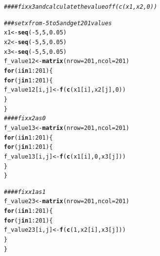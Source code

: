 \documentclass{article}\usepackage[]{graphicx}\usepackage[]{color}
\makeatletter
\newcommand{\hlnum}[1]{\textcolor[rgb]{0.686,0.059,0.569}{#1}}%
\newcommand{\hlcom}[1]{\textcolor[rgb]{0.678,0.584,0.686}{\textit{#1}}}%
\newcommand{\hlopt}[1]{\textcolor[rgb]{0,0,0}{#1}}%
\newcommand{\hlstd}[1]{\textcolor[rgb]{0.345,0.345,0.345}{#1}}%
\newcommand{\hlkwa}[1]{\textcolor[rgb]{0.161,0.373,0.58}{\textbf{#1}}}%
\newcommand{\hlkwb}[1]{\textcolor[rgb]{0.69,0.353,0.396}{#1}}%
\newcommand{\hlkwc}[1]{\textcolor[rgb]{0.333,0.667,0.333}{#1}}%
\newcommand{\hlkwd}[1]{\textcolor[rgb]{0.737,0.353,0.396}{\textbf{#1}}}%
\newenvironment{kframe}{%
 \def\at@end@of@kframe{}%
 \ifinner\ifhmode%
  \def\at@end@of@kframe{\end{minipage}}%
  \begin{minipage}{\columnwidth}%
 \fi\fi%
 \def\FrameCommand##1{\hskip\@totalleftmargin \hskip-\fboxsep
 \colorbox{shadecolor}{##1}\hskip-\fboxsep
     \hskip-\linewidth \hskip-\@totalleftmargin \hskip\columnwidth}%
 \MakeFramed {\advance\hsize-\width
   \@totalleftmargin\z@ \linewidth\hsize
   \@setminipage}}%
 {\par\unskip\endMakeFramed%
 \at@end@of@kframe}
\newenvironment{knitrout}{}{} %
\makeatother
\begin{document}
\begin{knitrout}
\color{fgcolor}\begin{kframe}
\begin{alltt}
\hlcom{####fix x3 and calculate the value of f(c(x1,x2,0))}

\hlcom{###set x from -5 to 5 and get 201 values}
\hlstd{x1}\hlkwb{<-}\hlkwd{seq}\hlstd{(}\hlopt{-}\hlnum{5}\hlstd{,}\hlnum{5}\hlstd{,}\hlnum{0.05}\hlstd{)}
\hlstd{x2}\hlkwb{<-}\hlkwd{seq}\hlstd{(}\hlopt{-}\hlnum{5}\hlstd{,}\hlnum{5}\hlstd{,}\hlnum{0.05}\hlstd{)}
\hlstd{x3}\hlkwb{<-}\hlkwd{seq}\hlstd{(}\hlopt{-}\hlnum{5}\hlstd{,}\hlnum{5}\hlstd{,}\hlnum{0.05}\hlstd{)}
\hlstd{f_value12}\hlkwb{<-}\hlkwd{matrix}\hlstd{(}\hlkwc{nrow}\hlstd{=}\hlnum{201}\hlstd{,}\hlkwc{ncol}\hlstd{=}\hlnum{201}\hlstd{)}
\hlkwa{for}\hlstd{(i} \hlkwa{in} \hlnum{1}\hlopt{:}\hlnum{201}\hlstd{)\{}
  \hlkwa{for}\hlstd{(j} \hlkwa{in} \hlnum{1}\hlopt{:}\hlnum{201}\hlstd{)\{}
    \hlstd{f_value12[i,j]}\hlkwb{<-}\hlkwd{f}\hlstd{(}\hlkwd{c}\hlstd{(x1[i],x2[j],}\hlnum{0}\hlstd{))}
  \hlstd{\}}
\hlstd{\}}
\hlcom{####fix x2 as 0}
\hlstd{f_value13}\hlkwb{<-}\hlkwd{matrix}\hlstd{(}\hlkwc{nrow}\hlstd{=}\hlnum{201}\hlstd{,}\hlkwc{ncol}\hlstd{=}\hlnum{201}\hlstd{)}
\hlkwa{for}\hlstd{(i} \hlkwa{in} \hlnum{1}\hlopt{:}\hlnum{201}\hlstd{)\{}
  \hlkwa{for}\hlstd{(j} \hlkwa{in} \hlnum{1}\hlopt{:}\hlnum{201}\hlstd{)\{}
    \hlstd{f_value13[i,j]}\hlkwb{<-}\hlkwd{f}\hlstd{(}\hlkwd{c}\hlstd{(x1[i],}\hlnum{0}\hlstd{,x3[j]))}
  \hlstd{\}}
\hlstd{\}}

\hlcom{####fix x1 as 1}
\hlstd{f_value23}\hlkwb{<-}\hlkwd{matrix}\hlstd{(}\hlkwc{nrow}\hlstd{=}\hlnum{201}\hlstd{,}\hlkwc{ncol}\hlstd{=}\hlnum{201}\hlstd{)}
\hlkwa{for}\hlstd{(i} \hlkwa{in} \hlnum{1}\hlopt{:}\hlnum{201}\hlstd{)\{}
  \hlkwa{for}\hlstd{(j} \hlkwa{in} \hlnum{1}\hlopt{:}\hlnum{201}\hlstd{)\{}
    \hlstd{f_value23[i,j]}\hlkwb{<-}\hlkwd{f}\hlstd{(}\hlkwd{c}\hlstd{(}\hlnum{1}\hlstd{,x2[i],x3[j]))}
  \hlstd{\}}
\hlstd{\}}
\end{alltt}
\end{kframe}
\end{knitrout}
\end{document}
